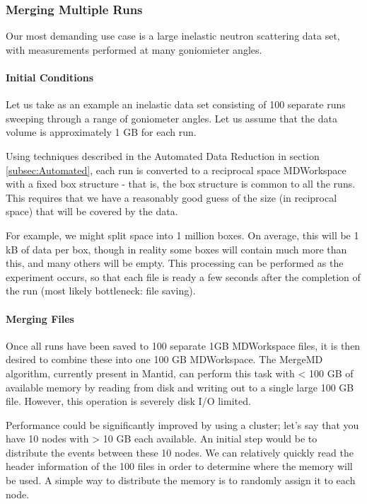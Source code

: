\subsubsection{Merging Multiple Runs}

Our most demanding use case is a large inelastic neutron scattering data set, with measurements performed at many goniomieter angles.

\paragraph{Initial Conditions}

Let us take as an example an inelastic data set consisting of 100 separate runs sweeping through a range of goniometer angles. Let us assume that the data volume is approximately 1 GB for each run.

Using techniques described in the Automated Data Reduction in section \ref{subsec:Automated}, each run is converted to a reciprocal space MDWorkspace with a fixed box structure - that is, the box structure is common to all the runs. This requires that we have a reasonably good guess of the size (in reciprocal space) that will be covered by the data. 

For example, we might split space into 1 million boxes. On average, this will be 1 kB of data per box, though in reality some boxes will contain much more than this, and many others will be empty. This processing can be performed as the experiment occurs, so that each file is ready a few seconds after the completion of the run (most likely bottleneck: file saving).

\paragraph{Merging Files}

Once all runs have been saved to 100 separate 1GB MDWorkspace files, it is then desired to combine these into one 100 GB MDWorkspace. The MergeMD algorithm, currently present in Mantid, can perform this task with < 100 GB of available memory by reading from disk and writing out to a single large 100 GB file. However, this operation is severely disk I/O limited.

Performance could be significantly improved by using a cluster; let's say that you have 10 nodes with > 10 GB each available. An initial step would be to distribute the events between these 10 nodes. We can relatively quickly read the header information of the 100 files in order to determine where the memory will be used. A simple way to distribute the memory is to randomly assign it to each node. 

